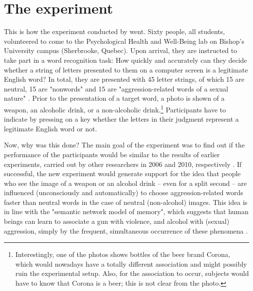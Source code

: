 \documentclass[twocolumn, serif, authordate, reflection]{jote-article}
\begin{document}
{}
\section*{The experiment}



This is how the experiment conducted by \textcite{Leboeuf2020} went. Sixty people, all students, volunteered to come to the Psychological Health and Well-Being lab on Bishop’s University campus (Sherbrooke, Quebec). Upon arrival, they are instructed to take part in a word recognition task: How quickly and accurately can they decide whether a string of letters presented to them on a computer screen is a legitimate English word? In total, they are presented with 45 letter strings, of which 15 are neutral, 15 are "nonwords" and 15 are "aggression-related words of a sexual nature" \parencite[p. 10]{Leboeuf2020}. Prior to the presentation of a target word, a photo is shown of a weapon, an alcoholic drink, or a non-alcoholic drink.\footnote{Interestingly, one of the photos shows bottles of the beer brand Corona, which would nowadays have a totally different association and might possibly ruin the experimental setup. Also, for the association to occur, subjects would have to know that Corona is a beer; this is not clear from the photo.} Participants have to indicate by pressing on a key whether the letters in their judgment represent a legitimate English word or not. 

Now, why was this done? The main goal of the experiment was to find out if the performance of the participants would be similar to the results of earlier experiments, carried out by other researchers in 2006 and 2010, respectively \parencite{Bartholow2006,Begue2012}. If successful, the new experiment would generate support for the idea that people who see the image of a weapon or an alcohol drink – even for a split second – are influenced (unconsciously and automatically) to choose aggression-related words faster than neutral words in the case of neutral (non-alcohol) images. This idea is in line with the "semantic network model of memory", which suggests that human beings can learn to associate a gun with violence, and alcohol with (sexual) aggression, simply by the frequent, simultaneous occurrence of these phenomena \parencite{Leboeuf2020}.
\end{document}
